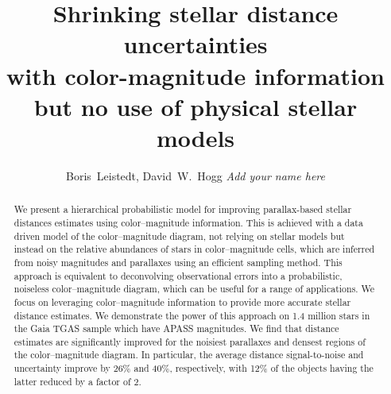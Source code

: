 \documentclass[manuscript, letterpaper]{aastex6}
\makeatletter
\let\origsection\section
\renewcommand\section{\@ifstar{\starsection}{\nostarsection}}
\newcommand\nostarsection[1]{\sectionprelude\origsection{#1}}
\newcommand\starsection[1]{\sectionprelude\origsection*{#1}}
\newcommand\sectionprelude{\vspace{1em}}
\makeatother
\begin{document}
 
\title{Shrinking stellar distance uncertainties\\
 with color-magnitude information \\
  but no use of physical stellar models}
  


\author{
	Boris~Leistedt,
	David~W.~Hogg
	\textit{Add your name here}
	}


  

\begin{abstract}
We present a hierarchical probabilistic model for improving parallax-based stellar distances estimates using color--magnitude information. 
This is achieved with a data driven model of the color--magnitude diagram, not relying on stellar models but instead on the  relative abundances of stars in color--magnitude cells, which are inferred from noisy magnitudes and parallaxes using an efficient sampling method.
This approach is equivalent to deconvolving observational errors into a probabilistic, noiseless color--magnitude diagram, which can be useful for a range of applications. 
We focus on leveraging color--magnitude information to provide more accurate stellar distance estimates.
We demonstrate the power of this approach on 1.4 million stars in the Gaia TGAS sample which have APASS magnitudes.
We find that distance estimates are significantly improved for the noisiest parallaxes and densest regions of the color--magnitude diagram. 
In particular, the average distance signal-to-noise and uncertainty improve by 26\% and 40\%, respectively, with 12\% of the objects having the latter reduced by a factor of 2.
\end{abstract}


\newpage
\section{Introduction}
\end{document}
